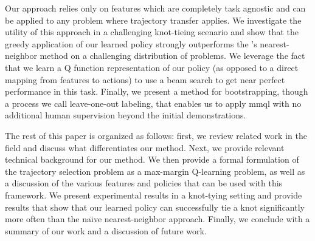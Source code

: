 
Our approach relies only on features which are completely task 
agnostic and can be applied to any problem where trajectory transfer applies. 
We investigate the utility of this approach in a challenging knot-tieing scenario 
and show that the greedy application of our learned policy strongly outperforms the 
\citet{Schulmanetal_ISRR2013}'s nearest-neighbor method on a challenging distribution of 
problems. 
We leverage the fact that we learn a Q function representation of our policy (as 
opposed to a direct mapping from features to actions) to use a beam search to get 
near perfect performance in this task.
Finally, we present a method for bootstrapping, though a process we call leave-one-out labeling, that enables us to apply {\sc mmql} with no additional human supervision beyond the initial demonstrations.




The rest of this paper is organized as follows: first, we review related work in
the field and discuss what differentiates our method. Next, we provide relevant
technical background for our method. We then provide a formal formulation of the
trajectory selection problem as a max-margin Q-learning problem, as well as a
discussion of the various features and policies that can be used with this
framework. We present experimental results in a knot-tying setting and provide
results that show that our learned policy can successfully tie a knot
significantly more often than the na\"{\i}ve nearest-neighbor approach. Finally,
we conclude with a summary of our work and a discussion of future work.
